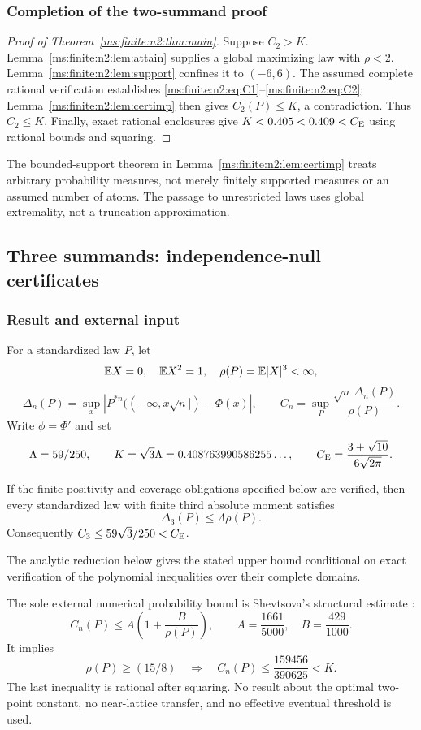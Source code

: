 \subsubsection{Completion of the two-summand proof}
\begin{proof}[Proof of Theorem~\ref{ms:finite:n2:thm:main}]
Suppose $C_2>K$. Lemma~\ref{ms:finite:n2:lem:attain} supplies a global maximizing law
with $\rho<2$. Lemma~\ref{ms:finite:n2:lem:support} confines it to $(-6,6)$.
The assumed complete rational verification establishes \eqref{ms:finite:n2:eq:C1}--\eqref{ms:finite:n2:eq:C2};
Lemma~\ref{ms:finite:n2:lem:certimp} then gives $C_2(P)\le K$, a contradiction.
Thus $C_2\le K$. Finally, exact rational enclosures give $K<0.405<0.409<C_{\mathrm E}$
using rational bounds and squaring.
\end{proof}
The bounded-support theorem in Lemma~\ref{ms:finite:n2:lem:certimp} treats arbitrary
probability measures, not merely finitely supported measures or an assumed
number of atoms. The passage to unrestricted laws uses global extremality,
not a truncation approximation.


\subsection{Three summands: independence-null certificates}\label{ms:finite:n3:section}
\subsubsection{Result and external input}
For a standardized law $P$, let
\[
 \mathbb E X=0,\quad \mathbb E X^2=1,\quad \rho(P)=\mathbb E|X|^3<\infty,
\]
\[
 \Delta_n(P)=\sup_x\left|P^{*n}(( -\infty,x\sqrt n])-\Phi(x)\right|,
 \qquad C_n=\sup_P\frac{\sqrt n\,\Delta_n(P)}{\rho(P)}.
\]
Write $\phi=\Phi'$ and set
\[
 \Lambda=59/250,\qquad K=\sqrt3\Lambda
 =0.408763990586255\ldots,
 \qquad C_{\mathrm E}=\frac{3+\sqrt{10}}{6\sqrt{2\pi}}.
\]
\begin{theorem}\label{ms:finite:n3:thm:main}
If the finite positivity and coverage obligations specified below are
verified, then every standardized law with finite third absolute moment satisfies
\[
 \boxed{\Delta_3(P)\le\Lambda\rho(P).}
\]
Consequently $C_3\le59\sqrt3/250<C_{\mathrm E}$.
\end{theorem}
The analytic reduction below gives the stated upper bound conditional on
exact verification of the polynomial inequalities over their complete domains.

The sole external numerical probability bound is Shevtsova's structural
estimate \cite{Shevtsova2013}:
\begin{equation}\label{ms:finite:n3:eq:struct}
 C_n(P)\le A\left(1+\frac B{\rho(P)}\right),
 \qquad A=\frac{1661}{5000},\quad B=\frac{429}{1000}.
\end{equation}
It implies
\begin{equation}\label{ms:finite:n3:eq:large}
 \rho(P)\ge(15/8)\quad\Longrightarrow\quad
 C_n(P)\le\frac{159456}{390625}<K.
\end{equation}
The last inequality is rational after squaring. No result about the optimal
two-point constant, no near-lattice transfer, and no effective eventual
threshold is used.

